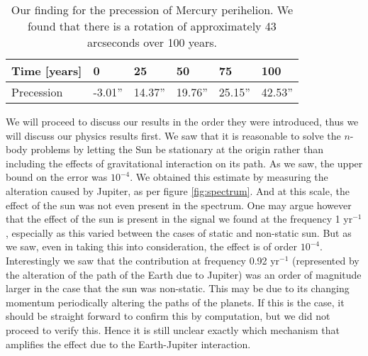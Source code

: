 \documentclass[11pt,english,a4paper]{article}
\begin{document}
\begin{table}
\center
\begin{tabular}{l l l l l l}
Time [years]& 0        & 25      & 50      & 75     & 100\\ 
\hline
Precession &-3.01''   &14.37''  &19.76''  &25.15'' & 42.53''
\end{tabular}
\caption{Our finding for the precession of Mercury perihelion. We found that there is a rotation of approximately 43 arcseconds over 100 years.} \label{tbl:grcorrection}
\end{table}
We will proceed to discuss our results in the order they were introduced, thus we will discuss our physics results first. We saw that it is reasonable to solve the $n$-body problems by letting the Sun be stationary at the origin rather than including the effects of gravitational interaction on its path. As we saw, the upper bound on the error was $10^{-4}$. We obtained this estimate by measuring the alteration caused by Jupiter, as per figure \ref{fig:spectrum}. And at this scale, the effect of the sun was not even present in the spectrum. One may argue however that the effect of the sun is present in the signal we found at the frequency 1 yr$^{-1}$, especially as this varied between the cases of static and non-static sun. But as we saw, even in taking this into consideration, the effect is of order $10^{-4}$. Interestingly we saw that the contribution at frequency 0.92 yr$^{-1}$ (represented by the alteration of the path of the Earth due to Jupiter) was an order of magnitude larger in the case that the sun was non-static. This may be due to its changing momentum periodically altering the paths of the planets. If this is the case, it should be straight forward to confirm this by computation, but we did not proceed to verify this. Hence it is still unclear exactly which mechanism that amplifies the effect due to the Earth-Jupiter interaction.\\
\\
\end{document}
